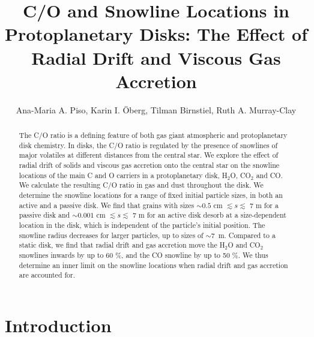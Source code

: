 \documentclass[apj]{emulateapj}
\begin{document}


\title{C/O and Snowline Locations in Protoplanetary Disks: The Effect of Radial Drift and Viscous Gas Accretion}

\author{Ana-Maria A. Piso, Karin I. \"Oberg, Tilman Birnstiel, Ruth A. Murray-Clay}


\begin{abstract}
The C/O ratio is a defining feature of both gas giant atmospheric and protoplanetary disk chemistry. In disks, the C/O ratio is regulated by the presence of snowlines of major volatiles at different distances from the central star.
We explore the effect of radial drift of solids and viscous gas accretion onto the central star on the snowline locations of the main C and O carriers in a protoplanetary disk, H$_2$O, CO$_2$ and CO.  We calculate the resulting C/O ratio in gas and dust throughout the disk. We determine the snowline locations for a range of fixed initial particle sizes, in both an active and a passive disk. We find that grains with sizes $\sim$$0.5$ cm $\lesssim s \lesssim$ 7 m for a passive disk and $\sim$$0.001$ cm $\lesssim s \lesssim$ 7 m for an active disk desorb %
at a %
size-dependent location in the disk, which is independent %
of the particle's initial position. The snowline radius decreases for larger particles, up to sizes of $\sim$7~m. %
Compared to a static disk, we find that radial drift and gas accretion move the H$_2$O and CO$_2$ snowlines inwards by up to 60 \%, and the CO snowline by up to 50 \%. We thus determine an inner limit on the snowline locations when radial drift and gas accretion are accounted for. %
\end{abstract}

\section{Introduction}
\end{document}
